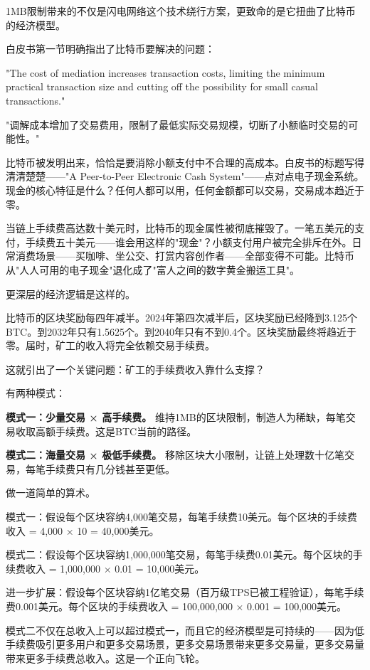 \documentclass[a4paper,12pt,openany]{ctexbook}
\newenvironment{quoting}{%
  \par\vspace{0.5em}%
  \begin{list}{}{%
    \setlength{\leftmargin}{2em}%
    \setlength{\rightmargin}{2em}%
    \setlength{\parsep}{0.3em}%
    \setlength{\itemsep}{0pt}%
    \setlength{\topsep}{0pt}%
  }%
  \item\relax
}{%
  \end{list}%
  \par\vspace{0.5em}%
}
\begin{document}
1MB限制带来的不仅是闪电网络这个技术绕行方案，更致命的是它扭曲了比特币的经济模型。

白皮书第一节明确指出了比特币要解决的问题：


\begin{quoting}
\small
"The cost of mediation increases transaction costs, limiting the minimum practical transaction size and cutting off the possibility for small casual transactions."

"调解成本增加了交易费用，限制了最低实际交易规模，切断了小额临时交易的可能性。"
\end{quoting}


比特币被发明出来，恰恰是要消除小额支付中不合理的高成本。白皮书的标题写得清清楚楚——"A Peer-to-Peer Electronic Cash System"——点对点电子现金系统。现金的核心特征是什么？任何人都可以用，任何金额都可以交易，交易成本趋近于零。

当链上手续费高达数十美元时，比特币的现金属性被彻底摧毁了。一笔五美元的支付，手续费五十美元——谁会用这样的"现金"？小额支付用户被完全排斥在外。日常消费场景——买咖啡、坐公交、打赏内容创作者——全部变得不可能。比特币从"人人可用的电子现金"退化成了"富人之间的数字黄金搬运工具"。

更深层的经济逻辑是这样的。

比特币的区块奖励每四年减半。2024年第四次减半后，区块奖励已经降到3.125个BTC。到2032年只有1.5625个。到2040年只有不到0.4个。区块奖励最终将趋近于零。届时，矿工的收入将完全依赖交易手续费。

这就引出了一个关键问题：矿工的手续费收入靠什么支撑？

有两种模式：

\textbf{模式一：少量交易 × 高手续费。} 维持1MB的区块限制，制造人为稀缺，每笔交易收取高额手续费。这是BTC当前的路径。

\textbf{模式二：海量交易 × 极低手续费。} 移除区块大小限制，让链上处理数十亿笔交易，每笔手续费只有几分钱甚至更低。

做一道简单的算术。

模式一：假设每个区块容纳4,000笔交易，每笔手续费10美元。每个区块的手续费收入 = 4,000 × 10 = 40,000美元。

模式二：假设每个区块容纳1,000,000笔交易，每笔手续费0.01美元。每个区块的手续费收入 = 1,000,000 × 0.01 = 10,000美元。

进一步扩展：假设每个区块容纳1亿笔交易（百万级TPS已被工程验证），每笔手续费0.001美元。每个区块的手续费收入 = 100,000,000 × 0.001 = 100,000美元。

模式二不仅在总收入上可以超过模式一，而且它的经济模型是可持续的——因为低手续费吸引更多用户和更多交易场景，更多交易场景带来更多交易量，更多交易量带来更多手续费总收入。这是一个正向飞轮。
\end{document}
